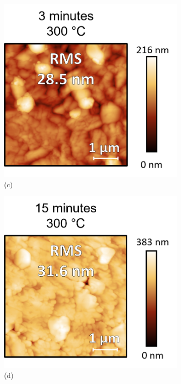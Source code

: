 \begin{figure}[htbp]
    \begin{subfigure}[t]{0.4\textwidth}
        \centering
        \includegraphics[width=\textwidth]{chapters/ellipsometry/image/300C_3min.png} %
        \caption*{(c)}
    \end{subfigure}
    \hfill
    \begin{subfigure}[t]{0.4\textwidth}
        \centering
        \includegraphics[width=\textwidth]{chapters/ellipsometry/image/300C_15min.png} %
        \caption*{(d)}
    \end{subfigure}
    \caption{}
\end{figure}





